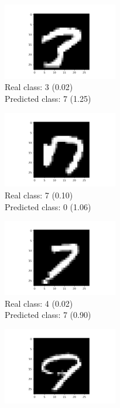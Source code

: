 \documentclass[a4paper]{article}    %
\begin{document}
\begin{figure}[H]
    \centering
    \begin{subfigure}{0.32\textwidth}
        \centering
        \includegraphics[width=5.0cm]{1}
        \caption{
            Real class: 3 (0.02)\\
            Predicted class: 7 (1.25)}
        \label{fig:example_1}
    \end{subfigure}
    \hfill
    \begin{subfigure}{0.32\textwidth}
        \centering
        \includegraphics[width=5.0cm]{4}
        \caption{
            Real class: 7 (0.10)\\
            Predicted class: 0 (1.06)}
        \label{fig:example_2}
    \end{subfigure}
    \hfill
    \begin{subfigure}{0.32\textwidth}
        \centering
        \includegraphics[width=5.0cm]{8}
        \caption{
            Real class: 4 (0.02)\\
            Predicted class: 7 (0.90)}
        \label{fig:example_3}
    \end{subfigure}
    \hfill
    \begin{subfigure}{0.32\textwidth}
        \centering
        \includegraphics[width=5.0cm]{11}

\end{subfigure}
\end{figure}
\end{document}
